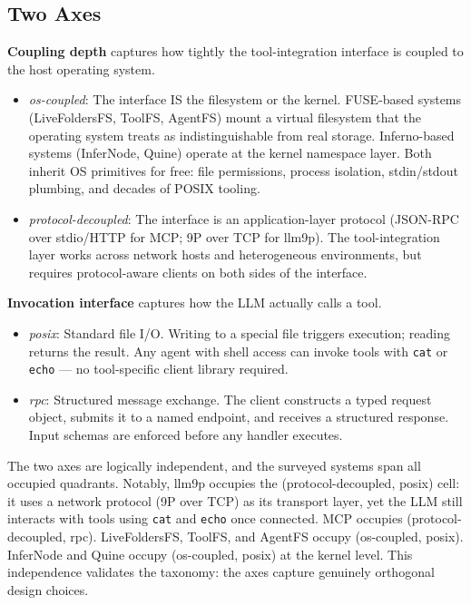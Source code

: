 \documentclass[
  11pt,
]{article}
\providecommand{\tightlist}{%
  \setlength{\itemsep}{0pt}\setlength{\parskip}{0pt}}
\begin{document}
\hypertarget{two-axes}{%
\subsection{Two Axes}\label{two-axes}}

\textbf{Coupling depth} captures how tightly the tool-integration
interface is coupled to the host operating system.

\begin{itemize}
\tightlist
\item
  \emph{os-coupled}: The interface IS the filesystem or the kernel.
  FUSE-based systems (LiveFoldersFS, ToolFS, AgentFS) mount a virtual
  filesystem that the operating system treats as indistinguishable from
  real storage. Inferno-based systems (InferNode, Quine) operate at the
  kernel namespace layer. Both inherit OS primitives for free: file
  permissions, process isolation, stdin/stdout plumbing, and decades of
  POSIX tooling.
\item
  \emph{protocol-decoupled}: The interface is an application-layer
  protocol (JSON-RPC over stdio/HTTP for MCP; 9P over TCP for llm9p).
  The tool-integration layer works across network hosts and
  heterogeneous environments, but requires protocol-aware clients on
  both sides of the interface.
\end{itemize}

\textbf{Invocation interface} captures how the LLM actually calls a
tool.

\begin{itemize}
\tightlist
\item
  \emph{posix}: Standard file I/O. Writing to a special file triggers
  execution; reading returns the result. Any agent with shell access can
  invoke tools with \texttt{cat} or \texttt{echo} --- no tool-specific
  client library required.
\item
  \emph{rpc}: Structured message exchange. The client constructs a typed
  request object, submits it to a named endpoint, and receives a
  structured response. Input schemas are enforced before any handler
  executes.
\end{itemize}

The two axes are logically independent, and the surveyed systems span
all occupied quadrants. Notably, llm9p occupies the (protocol-decoupled,
posix) cell: it uses a network protocol (9P over TCP) as its transport
layer, yet the LLM still interacts with tools using \texttt{cat} and
\texttt{echo} once connected. MCP occupies (protocol-decoupled, rpc).
LiveFoldersFS, ToolFS, and AgentFS occupy (os-coupled, posix). InferNode
and Quine occupy (os-coupled, posix) at the kernel level. This
independence validates the taxonomy: the axes capture genuinely
orthogonal design choices.
\end{document}
